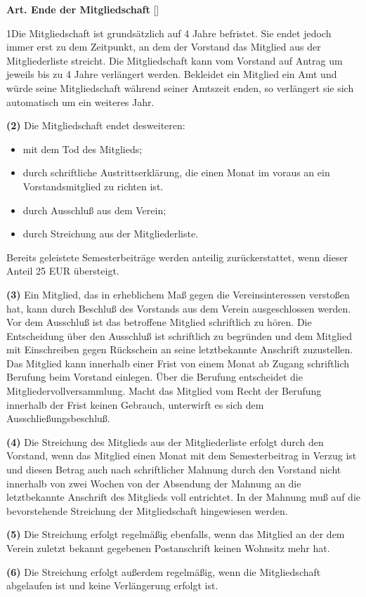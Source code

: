 \documentclass[12pt]{article}
\newcommand{\Satz}[2]{

\begin{samepage}
{\bf (#1)} #2
\end{samepage}
}
\newenvironment{Artikel}[2]{
\bigskip \centerline{{\bf Art. #1} [#2]}
\nopagebreak
}{
}
\begin{document}
\begin{Artikel}{10}{Ende der Mitgliedschaft}

\Satz{1}{Die Mitgliedschaft ist grundsätzlich auf 4 Jahre befristet.
Sie endet jedoch immer erst zu dem Zeitpunkt, an dem der Vorstand das
Mitglied aus der Mitgliederliste streicht.
Die Mitgliedschaft kann vom Vorstand auf Antrag um jeweils bis zu 4 Jahre 
verlängert werden.
Bekleidet ein Mitglied ein Amt und würde seine Mitgliedschaft während seiner
Amtszeit enden, so verlängert sie sich automatisch um ein weiteres Jahr.}

\Satz{2}{Die Mitgliedschaft endet desweiteren:
\begin{itemize}
\item mit dem Tod des Mitglieds;
\item durch schriftliche Austrittserklärung, die einen Monat im voraus an
ein Vorstandsmitglied zu richten ist. 
\item durch Ausschluß aus dem Verein;
\item durch Streichung aus der Mitgliederliste.
\end{itemize}
Bereits geleistete Semesterbeiträge werden anteilig zurückerstattet, wenn
dieser Anteil 25 EUR übersteigt.}

\Satz{3}{Ein Mitglied, das in erheblichem Maß gegen die Vereinsinteressen
verstoßen hat, kann durch Beschluß des Vorstands aus dem Verein ausgeschlossen
werden. Vor dem Ausschluß ist das betroffene Mitglied schriftlich zu hören. Die
Entscheidung über den Ausschluß ist schriftlich zu begründen und dem Mitglied
mit Einschreiben gegen Rückschein an seine letztbekannte Anschrift zuzustellen.
Das Mitglied kann innerhalb einer Frist von einem Monat ab Zugang schriftlich
Berufung beim Vorstand einlegen. Über die Berufung entscheidet die
Mitgliedervollversammlung. Macht das Mitglied vom Recht der Berufung innerhalb
der Frist keinen Gebrauch, unterwirft es sich dem Ausschließungsbeschluß.}

\Satz{4}{Die Streichung des Mitglieds aus der Mitgliederliste erfolgt durch den
Vorstand, wenn das Mitglied einen Monat mit dem Semesterbeitrag in Verzug ist
und diesen Betrag auch nach schriftlicher Mahnung durch den Vorstand nicht
innerhalb von zwei Wochen von der Absendung der Mahnung an die letztbekannte
Anschrift des Mitglieds voll entrichtet. In der Mahnung muß auf die
bevorstehende Streichung der Mitgliedschaft hingewiesen werden.}

\Satz{5}{Die Streichung erfolgt regelmäßig ebenfalls, wenn das Mitglied an der
dem Verein zuletzt bekannt gegebenen Postanschrift keinen Wohnsitz mehr hat.}

\Satz{6}{Die Streichung erfolgt außerdem regelmäßig, wenn die Mitgliedschaft
abgelaufen ist und keine Verlängerung erfolgt ist.}

\end{Artikel}
\end{document}
